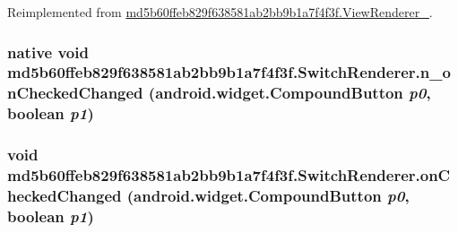 Reimplemented from \hyperlink{classmd5b60ffeb829f638581ab2bb9b1a7f4f3f_1_1_view_renderer__2_dae20979ac761a65aa60c9b427509c37}{md5b60ffeb829f638581ab2bb9b1a7f4f3f.ViewRenderer\_}.\hypertarget{classmd5b60ffeb829f638581ab2bb9b1a7f4f3f_1_1_switch_renderer_6d1599f163e2b3ba3d0c2223d62e8b34}{
\subsubsection[{n\_\-onCheckedChanged}]{\setlength{\rightskip}{0pt plus 5cm}native void md5b60ffeb829f638581ab2bb9b1a7f4f3f.SwitchRenderer.n\_\-onCheckedChanged (android.widget.CompoundButton {\em p0}, \/  boolean {\em p1})}}
\label{classmd5b60ffeb829f638581ab2bb9b1a7f4f3f_1_1_switch_renderer_6d1599f163e2b3ba3d0c2223d62e8b34}


\hypertarget{classmd5b60ffeb829f638581ab2bb9b1a7f4f3f_1_1_switch_renderer_cb3eb70920f926f8b36888ee849e7ab7}{
\subsubsection[{onCheckedChanged}]{\setlength{\rightskip}{0pt plus 5cm}void md5b60ffeb829f638581ab2bb9b1a7f4f3f.SwitchRenderer.onCheckedChanged (android.widget.CompoundButton {\em p0}, \/  boolean {\em p1})}}
\label{classmd5b60ffeb829f638581ab2bb9b1a7f4f3f_1_1_switch_renderer_cb3eb70920f926f8b36888ee849e7ab7}




